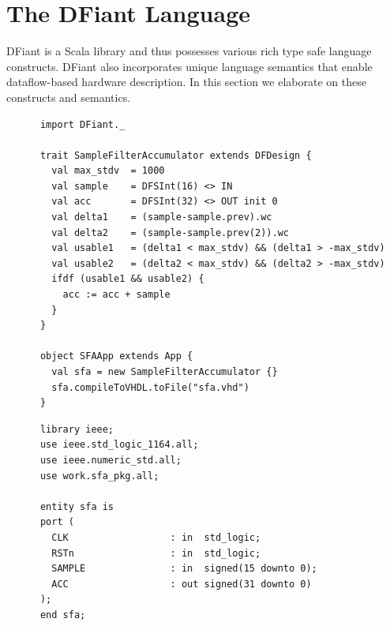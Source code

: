 \section{The DFiant Language}
\label{sec:dfiant}
DFiant is a Scala library and thus possesses various rich type safe language constructs. DFiant also incorporates unique language semantics that enable dataflow-based hardware description. In this section we elaborate on these constructs and semantics.

\begin{table}[t!]
  \centering
  \begin{minipage}[t][6.8cm][t]{\linewidth}
    \centering
    \begin{verbatim}
      import DFiant._
      
      trait SampleFilterAccumulator extends DFDesign {
        val max_stdv  = 1000
        val sample    = DFSInt(16) <> IN
        val acc       = DFSInt(32) <> OUT init 0
        val delta1    = (sample-sample.prev).wc
        val delta2    = (sample-sample.prev(2)).wc
        val usable1   = (delta1 < max_stdv) && (delta1 > -max_stdv)
        val usable2   = (delta2 < max_stdv) && (delta2 > -max_stdv)
        ifdf (usable1 && usable2) {
          acc := acc + sample
        }
      }    
      
      object SFAApp extends App {
        val sfa = new SampleFilterAccumulator {}
        sfa.compileToVHDL.toFile("sfa.vhd")
      }
    \end{verbatim}
    \label{fig:AES_Compare_Graph}
  \end{minipage}

  \begin{minipage}[t][16cm][t]{\linewidth}
    \centering
    \begin{verbatim}
      library ieee;
      use ieee.std_logic_1164.all;
      use ieee.numeric_std.all;
      use work.sfa_pkg.all;
      
      entity sfa is
      port (
        CLK                  : in  std_logic;
        RSTn                 : in  std_logic;
        SAMPLE               : in  signed(15 downto 0);
        ACC                  : out signed(31 downto 0)
      );
      end sfa;
      

\end{verbatim}
\end{minipage}
\end{table}
